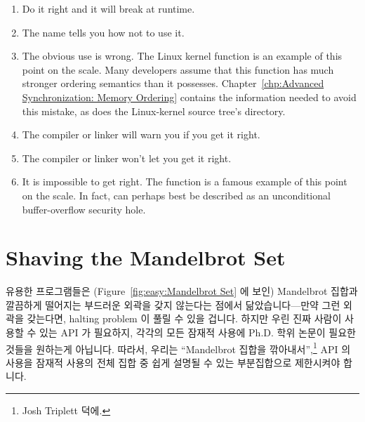 \begin{enumerate}
\item	Do it right and it will break at runtime.
\item	The name tells you how not to use it.
\item	The obvious use is wrong.
	The Linux kernel  function is an example of
	this point on the scale.
	Many developers assume that this function has much
	stronger ordering semantics than it possesses.
	Chapter~\ref{chp:Advanced Synchronization: Memory Ordering} contains the
	information needed to avoid this mistake, as does the
	Linux-kernel source tree's  directory.
\item	The compiler or linker will warn you if you get it right.
\item	The compiler or linker won't let you get it right.
\item	It is impossible to get right.
	The  function is a famous example of this point on
	the scale.
	In fact,  can perhaps best be described as
	an unconditional buffer-overflow security hole.
\fi
\end{enumerate}

\section{Shaving the Mandelbrot Set}
\label{sec:easy:Shaving the Mandelbrot Set}

유용한 프로그램들은
(Figure~\ref{fig:easy:Mandelbrot Set} 에 보인) Mandelbrot 집합과 깔끔하게
떨어지는 부드러운 외곽을 갖지 않는다는 점에서 닮았습니다---만약 그런 외곽을
갖는다면, halting problem 이 풀릴 수 있을 겁니다.
하지만 우린 진짜 사람이 사용할 수 있는 API 가 필요하지, 각각의 모든 잠재적
사용에 Ph.D. 학위 논문이 필요한 것들을 원하는게 아닙니다.
따라서, 우리는 ``Mandelbrot 집합을 깎아내서'',\footnote{
	Josh Triplett 덕에.}
API 의 사용을 잠재적 사용의 전체 집합 중 쉽게 설명될 수 있는 부분집합으로
제한시켜야 합니다.

